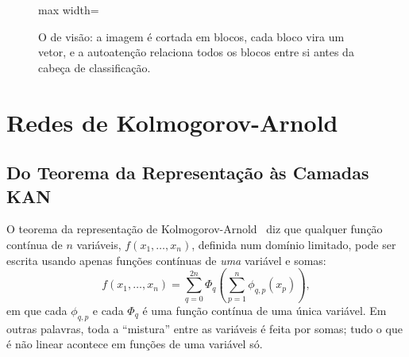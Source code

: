 \begin{figure}[htpb]
\centering
\begin{adjustbox}{max width=\textwidth}
\end{adjustbox}
\caption{O  de visão: a imagem é cortada em blocos, cada bloco vira um vetor, e a autoatenção relaciona todos os blocos entre si antes da cabeça de classificação.}
\label{fig:vit}
\end{figure}

\section{Redes de Kolmogorov-Arnold}
\label{sec:kan_background}

\subsection{Do Teorema da Representação às Camadas KAN}

O teorema da representação de Kolmogorov-Arnold~\cite{kolmogorov1957representation} diz que qualquer função contínua de $n$ variáveis, $f(x_1, \ldots, x_n)$, definida num domínio limitado, pode ser escrita usando apenas funções contínuas de \emph{uma} variável e somas:
\begin{equation}
f(x_1, \ldots, x_n) = \sum_{q=0}^{2n} \Phi_q\!\left(\sum_{p=1}^{n} \phi_{q,p}(x_p)\right),
\end{equation}
em que cada $\phi_{q,p}$ e cada $\Phi_q$ é uma função contínua de uma única variável. Em outras palavras, toda a ``mistura'' entre as variáveis é feita por somas; tudo o que é não linear acontece em funções de uma variável só.

